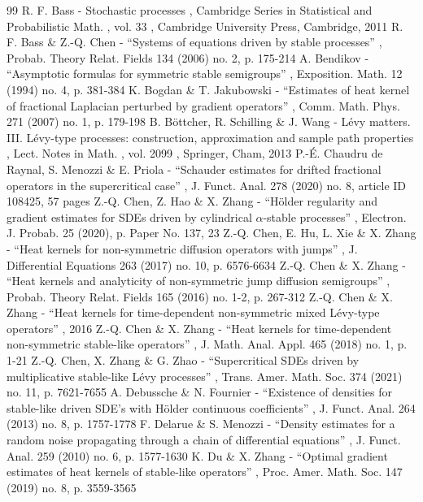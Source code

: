 \begin{thebibliography}{99}
 R. F. Bass - Stochastic processes , Cambridge Series in Statistical and Probabilistic Math. , vol. 33 , Cambridge University Press, Cambridge, 2011
 R. F. Bass \& Z.-Q. Chen - “Systems of equations driven by stable processes” , Probab. Theory Relat. Fields 134 (2006) no. 2, p. 175-214
 A. Bendikov - “Asymptotic formulas for symmetric stable semigroups” , Exposition. Math. 12 (1994) no. 4, p. 381-384
 K. Bogdan \& T. Jakubowski - “Estimates of heat kernel of fractional Laplacian perturbed by gradient operators” , Comm. Math. Phys. 271 (2007) no. 1, p. 179-198
 B. Böttcher, R. Schilling \& J. Wang - Lévy matters. III. Lévy-type processes: construction, approximation and sample path properties , Lect. Notes in Math. , vol. 2099 , Springer, Cham, 2013
 P.-É. Chaudru de Raynal, S. Menozzi \& E. Priola - “Schauder estimates for drifted fractional operators in the supercritical case” , J. Funct. Anal. 278 (2020) no. 8, article ID 108425, 57 pages
 Z.-Q. Chen, Z. Hao \& X. Zhang - “Hölder regularity and gradient estimates for SDEs driven by cylindrical $\alpha $-stable processes” , Electron. J. Probab. 25 (2020), p. Paper No. 137, 23
 Z.-Q. Chen, E. Hu, L. Xie \& X. Zhang - “Heat kernels for non-symmetric diffusion operators with jumps” , J. Differential Equations 263 (2017) no. 10, p. 6576-6634
 Z.-Q. Chen \& X. Zhang - “Heat kernels and analyticity of non-symmetric jump diffusion semigroups” , Probab. Theory Relat. Fields 165 (2016) no. 1-2, p. 267-312
 Z.-Q. Chen \& X. Zhang - “Heat kernels for time-dependent non-symmetric mixed Lévy-type operators” , 2016
 Z.-Q. Chen \& X. Zhang - “Heat kernels for time-dependent non-symmetric stable-like operators” , J. Math. Anal. Appl. 465 (2018) no. 1, p. 1-21
 Z.-Q. Chen, X. Zhang \& G. Zhao - “Supercritical SDEs driven by multiplicative stable-like Lévy processes” , Trans. Amer. Math. Soc. 374 (2021) no. 11, p. 7621-7655
 A. Debussche \& N. Fournier - “Existence of densities for stable-like driven SDE’s with Hölder continuous coefficients” , J. Funct. Anal. 264 (2013) no. 8, p. 1757-1778
 F. Delarue \& S. Menozzi - “Density estimates for a random noise propagating through a chain of differential equations” , J. Funct. Anal. 259 (2010) no. 6, p. 1577-1630
 K. Du \& X. Zhang - “Optimal gradient estimates of heat kernels of stable-like operators” , Proc. Amer. Math. Soc. 147 (2019) no. 8, p. 3559-3565

\end{thebibliography}
